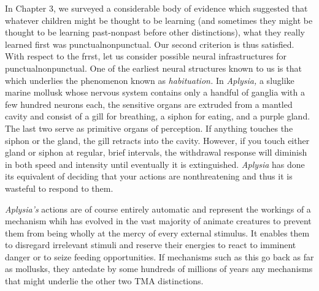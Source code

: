 In Chapter 3, we surveyed a considerable body of evidence which suggested that whatever children might be thought to be learning (and sometimes they might be thought to be learning past-nonpast before other distinctions), what they really learned first was punctual\-nonpunctual. Our second criterion is thus satisfied. With respect to the frrst, let us consider possible neural infrastructures for punctual\-nonpunctual. One of the earliest neural structures known to us is that which underlies the phenomenon known as \textit{habituation. }In \textit{Aplysia,} a sluglike marine mollusk whose nervous system contains only a hand\-ful of ganglia with a few hundred neurons each, the sensitive organs are extruded from a mantled cavity and consist of a gill for breathing, a siphon for eating, and a purple gland. The last two serve as primitive organs of perception. If anything touches the siphon or the gland, the gill retracts into the cavity. However, if you touch either gland or siphon at regular, brief intervals, the withdrawal response will diminish in both speed and intensity until eventually it is extinguished. \textit{Aplysia} has done its equivalent of deciding that your actions are nonthreatening and thus it is wasteful to respond to them.

\textit{Aplysia's} actions are of course entirely automatic and represent the workings of a mechanism whih has evolved in the vast majority of
animate creatures to prevent them from being wholly at the mercy of every external stimulus. It enables them to disregard irrelevant stimuli and reserve their energies to react to imminent danger or to seize feeding opportunities. If mechanisms such as this go back as far as mollusks, they antedate by some hundreds of millions of years any mechanisms that might underlie the other two TMA distinctions.

